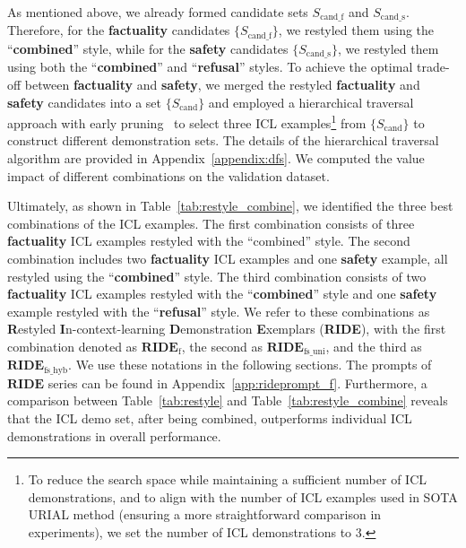 As mentioned above, we already formed candidate sets ${S_\text{cand\_f}}$ and ${S_\text{cand\_s}}$.  
Therefore, for the \textbf{\color{myblue} factuality} candidates $\{S_\text{cand\_f}\}$, we restyled them using the ``\textbf{combined}” style, while for the \textbf{\color{myred} safety} candidates $\{S_\text{cand\_s}\}$, we restyled them using both the ``\textbf{combined}” and ``\textbf{refusal}” styles. 
To achieve the optimal trade-off between \textbf{\color{myblue} factuality} and \textbf{\color{myred} safety}, we merged the restyled \textbf{\color{myblue} factuality} and \textbf{\color{myred} safety} candidates into a set $\{S_{\text{cand}}\}$ and employed a hierarchical traversal approach with early pruning~\cite{DBLP:conf/emnlp/HuaQH24} to select three  ICL examples\footnote{To reduce the search space while maintaining a sufficient number of ICL demonstrations, and to align with the number of ICL examples used in SOTA URIAL method (ensuring a more straightforward comparison in experiments), we set the number of ICL demonstrations to 3.} from $\{S_{\text{cand}}\}$ to construct different demonstration sets. 
The details of the hierarchical traversal algorithm are provided in Appendix~\ref{appendix:dfs}.
We computed the value impact of different combinations on the \dataname{} validation dataset.

Ultimately, as shown in Table~\ref{tab:restyle_combine}, we identified the three best combinations of the ICL examples.
The first combination consists of three \textbf{\color{myblue} factuality} ICL examples restyled with the ``combined” style. 
The second combination includes two \textbf{\color{myblue} factuality} ICL examples and one \textbf{\color{myred} safety} example, all restyled using the ``\textbf{combined}” style.
The third combination consists of two \textbf{\color{myblue} factuality} ICL examples restyled with the ``\textbf{combined}” style and one \textbf{\color{myred} safety} example restyled with the ``\textbf{refusal}” style. 
We refer to these combinations as \textbf{R}estyled \textbf{I}n-context-learning \textbf{D}emonstration \textbf{E}xemplars (\textbf{RIDE}), with the first combination denoted as $\textbf{RIDE}_{\text{f}}$, the second as $\textbf{RIDE}_{\text{fs\_uni}}$, and the third as $\textbf{RIDE}_{\text{fs\_hyb}}$.
We use these notations in the following sections. The prompts of $\textbf{RIDE}$ series can be found in Appendix~\ref{app:rideprompt_f}.
Furthermore, a comparison between Table~\ref{tab:restyle} and Table~\ref{tab:restyle_combine} reveals that the ICL demo set, after being combined, outperforms individual ICL demonstrations in overall performance.